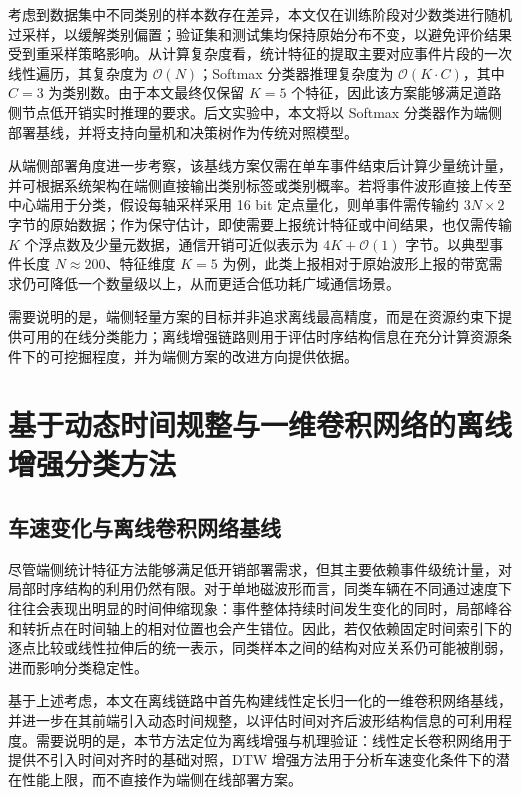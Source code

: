 考虑到数据集中不同类别的样本数存在差异，本文仅在训练阶段对少数类进行随机过采样，以缓解类别偏置；验证集和测试集均保持原始分布不变，以避免评价结果受到重采样策略影响。从计算复杂度看，统计特征的提取主要对应事件片段的一次线性遍历，其复杂度为 $\mathcal{O}(N)$；Softmax 分类器推理复杂度为 $\mathcal{O}(K\cdot C)$，其中 $C=3$ 为类别数。由于本文最终仅保留 $K=5$ 个特征，因此该方案能够满足道路侧节点低开销实时推理的要求。后文实验中，本文将以 Softmax 分类器作为端侧部署基线，并将支持向量机和决策树作为传统对照模型。


从端侧部署角度进一步考察，该基线方案仅需在单车事件结束后计算少量统计量，并可根据系统架构在端侧直接输出类别标签或类别概率。若将事件波形直接上传至中心端用于分类，假设每轴采样采用 16 bit 定点量化，则单事件需传输约 $3N\times 2$ 字节的原始数据；作为保守估计，即使需要上报统计特征或中间结果，也仅需传输 $K$ 个浮点数及少量元数据，通信开销可近似表示为 $4K+\mathcal{O}(1)$ 字节。以典型事件长度 $N\approx 200$、特征维度 $K=5$ 为例，此类上报相对于原始波形上报的带宽需求仍可降低一个数量级以上，从而更适合低功耗广域通信场景。

需要说明的是，端侧轻量方案的目标并非追求离线最高精度，而是在资源约束下提供可用的在线分类能力；离线增强链路则用于评估时序结构信息在充分计算资源条件下的可挖掘程度，并为端侧方案的改进方向提供依据。

\section{基于动态时间规整与一维卷积网络的离线增强分类方法}
\label{sec:ch3_offline}

\subsection{车速变化与离线卷积网络基线}
\label{subsec:ch3_offline_base}

尽管端侧统计特征方法能够满足低开销部署需求，但其主要依赖事件级统计量，对局部时序结构的利用仍然有限。对于单地磁波形而言，同类车辆在不同通过速度下往往会表现出明显的时间伸缩现象：事件整体持续时间发生变化的同时，局部峰谷和转折点在时间轴上的相对位置也会产生错位。因此，若仅依赖固定时间索引下的逐点比较或线性拉伸后的统一表示，同类样本之间的结构对应关系仍可能被削弱，进而影响分类稳定性。

基于上述考虑，本文在离线链路中首先构建线性定长归一化的一维卷积网络基线，并进一步在其前端引入动态时间规整，以评估时间对齐后波形结构信息的可利用程度。需要说明的是，本节方法定位为离线增强与机理验证：线性定长卷积网络用于提供不引入时间对齐时的基础对照，DTW 增强方法用于分析车速变化条件下的潜在性能上限，而不直接作为端侧在线部署方案。

